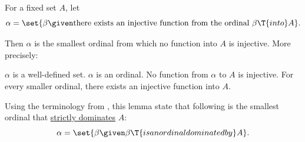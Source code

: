 \begin{lemma}\label{thm:hartogs_lemma}
  For a fixed set \( A \), let
  \begin{equation*}
    \alpha = \set{ \beta \given \text{there exists an injective function from the ordinal } \beta \T{into} A }.
  \end{equation*}

  Then \( \alpha \) is the smallest ordinal from which no function into \( A \) is injective. More precisely:
  \begin{thmenum}
     \( \alpha \) is a well-defined set.
     \( \alpha \) is an ordinal.
     No function from \( \alpha \) to \( A \) is injective.
     For every smaller ordinal, there exists an injective function into \( A \).
  \end{thmenum}
\end{lemma}
\begin{comments}
  \item Using the terminology from , this lemma state that following is the smallest ordinal that \hyperref[def:equinumerosity]{strictly dominates} \( A \):
  \begin{equation*}
    \alpha = \set{ \beta \given \beta \T{is an ordinal dominated by} A }.
  \end{equation*}
\end{comments}
